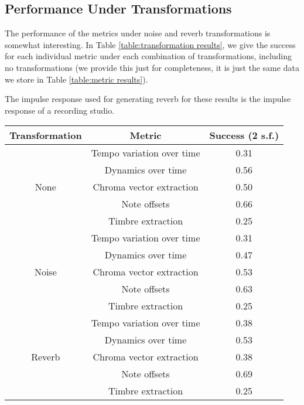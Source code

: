 \documentclass[oneside, class=book, 12pt, crop=false]{standalone}
\begin{document}
\subsection{Performance Under Transformations}

The performance of the metrics under noise and reverb transformations is somewhat interesting. In Table \ref{table:transformation results}, we give the success for each individual metric under each combination of transformations, including no transformations (we provide this just for completeness, it is just the same data we store in Table \ref{table:metric results}).

The impulse response used for generating reverb for these results is the impulse response of a recording studio.

\begin{table}[h]
    \centering
    \begin{tabular}{c|cc}
        \textbf{Transformation}&\textbf{Metric}&\textbf{Success} (2 s.f.) \\
        \midrule[0.15em]
        \multirow{5}{*}{None} &Tempo variation over time&0.31 \\ \cline{2-3}
                              &Dynamics over time&0.56 \\ \cline{2-3}
                              &Chroma vector extraction&0.50 \\ \cline{2-3}
                              &Note offsets&0.66 \\ \cline{2-3}
                              &Timbre extraction&0.25\\ \midrule[0.1em]
        \multirow{5}{*}{Noise} & Tempo variation over time & 0.31 \\ \cline{2-3}
                               &Dynamics over time & 0.47 \\ \cline{2-3}
                               &Chroma vector extraction & 0.53 \\ \cline{2-3}
                               &Note offsets & 0.63 \\ \cline{2-3}
                               &Timbre extraction & 0.25 \\ \midrule[0.1em]
        \multirow{5}{*}{Reverb} & Tempo variation over time & 0.38 \\ \cline{2-3}
                                &Dynamics over time & 0.53 \\ \cline{2-3}
                                &Chroma vector extraction & 0.38 \\ \cline{2-3}
                                &Note offsets & 0.69 \\ \cline{2-3}
                                &Timbre extraction & 0.25 \\ \midrule[0.1em]


\end{tabular}
\end{table}
\end{document}
